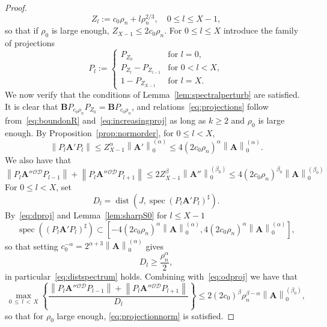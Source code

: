 \documentclass[AHL,Unicode,longabstracts,published]{cedram}
\DeclareMathOperator{\spec}{spec}
\DeclareMathOperator{\dist}{dist}
\newcommand{\CD}{\mathcal{D}}
\newcommand{\CO}{\mathcal{O}}
\newcommand{\BA}{\mathbf A}
\newcommand{\BB}{\mathbf B}
\newcommand{\set}[1]{\left\{ #1 \right\}}
\newcommand{\norm}[1]{\left\| #1 \right\|}
\newcommand{\snorm}[3]{\left\| #1\right\|_{#3}^{(#2)}}
\begin{document}
\begin{proof}
\begin{equation}
Z_l := c_0 \rho_n + l \rho_n^{2/3}, \quad 0 \le l \le X - 1,
\end{equation}
so that if $\rho_0$ is large enough, $Z_{X - 1} \le 2 c_0 \rho_n$. For $0 \le l \le X$ introduce the family of projections
\begin{equation}
P_l :=
\begin{cases}
P_{Z_0} & \text{for } l = 0, \\
P_{Z_l} - P_{Z_{l -1}} & \text{for } 0 < l < X, \\
1 - P_{Z_{X - 1}} & \text{for } l = X.
\end{cases}
\end{equation}
We now verify that the conditions of Lemma~\ref{lem:spectralperturb} are satisfied. It is clear that $\BB P_{c_0\rho_n} P_{Z_0} = \BB P_{c_0\rho_n}$, and relations~\eqref{eq:projections} follow from~\eqref{eq:boundonR} and~\eqref{eq:increasingproj} as long as $k
\ge 2$ and $\rho_0$ is large enough. By Proposition~\ref{prop:normorder}, for $0 \le l < X$,
\begin{equation}\label{eq:dproj}
\norm{P_l \BA' P_l} \le Z_{X-1}^\alpha \snorm{\BA'}{\alpha}{0}
\le 4(2 c_0
\rho_n)^\alpha \snorm{\BA}{\alpha}{0}.
\end{equation}
We also have that
\begin{equation}\label{eq:odproj}
\norm{P_l \BA''{}^{\CO\CD} P_{l-1}} +
\norm{P_l \BA''{}^{\CO\CD} P_{l+1}} \le 2 Z_{X-1}^{\beta}
\snorm{\BA''}{\beta_0}{0} \le 4 (2c_0\rho_n)^{\beta_0}
\snorm{\BA}{\beta_0}{0}
\end{equation}
For $0 \le l < X$, set
\begin{equation}
D_l = \dist(J,\spec(P_l \BA' P_l)^\sharp).
\end{equation}
By~\eqref{eq:dproj} and Lemma~\ref{lem:sharpS0} for $l \le X - 1$
\begin{equation}
\spec((P_l \BA' P_l)^\sharp) \subset \left[- 4(2 c_0
\rho_n)^\alpha\snorm{\BA}{\alpha}{0}, 4(2 c_0 \rho_n)^\alpha\snorm{\BA}{\alpha}{0}
\right],
\end{equation}
so that setting $ c_0^{-\alpha} = 2^{\alpha+ 3} \snorm{\BA}{\alpha}{0}$ gives
\begin{equation}
D_l \ge \frac{\rho_n^\alpha}{2},
\end{equation}
in particular~\eqref{eq:distspectrum} holds. Combining with~\eqref{eq:odproj} we have that
\begin{equation}
\max_{0\,\le\,l\,<\,X} \set{\frac{
\norm{P_l \BA''{}^{\CO\CD} P_{l-1}}+
\norm{P_l \BA''{}^{\CO\CD} P_{l+1}}}{D_l}} \le 2 (2c_0)^\beta \rho_n^{\beta -
\alpha} \snorm{\BA}{\beta_0}{0},
\end{equation}
so that for $\rho_0$ large enough, \eqref{eq:projectionnorm} is satisfied.


\end{proof}
\end{document}
